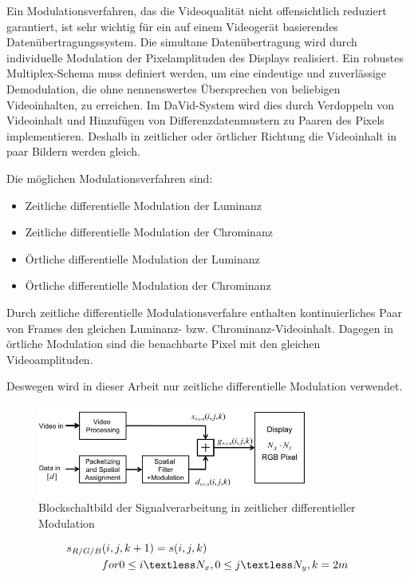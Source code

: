 Ein Modulationsverfahren, das die Videoqualität nicht offensichtlich reduziert garantiert, ist sehr wichtig für ein auf einem Videogerät basierendes Datenübertragungssystem. Die simultane Datenübertragung wird durch individuelle Modulation der Pixelamplituden des Displays realisiert. Ein robustes Multiplex-Schema muss definiert werden, um eine eindeutige und zuverlässige Demodulation, die ohne nennenswertes Übersprechen von beliebigen Videoinhalten, zu erreichen. Im DaVid-System wird dies durch Verdoppeln von Videoinhalt und Hinzufügen von Differenzdatenmustern zu Paaren des Pixels implementieren. Deshalb in zeitlicher oder örtlicher Richtung die Videoinhalt in paar Bildern werden gleich.


Die möglichen Modulationsverfahren sind:
\begin{itemize}
  \item Zeitliche differentielle Modulation der Luminanz
  \item Zeitliche differentielle Modulation der Chrominanz
  \item Örtliche differentielle Modulation der Luminanz
  \item Örtliche differentielle Modulation der Chrominanz
\end{itemize}

Durch zeitliche differentielle Modulationsverfahre enthalten kontinuierliches Paar von Frames den gleichen Luminanz- bzw. Chrominanz-Videoinhalt. Dagegen in örtliche Modulation sind die benachbarte Pixel mit den gleichen Videoamplituden.


Deswegen wird in dieser Arbeit nur zeitliche differentielle Modulation verwendet.

\begin{figure}[htb]
 \centering 
 \includegraphics[keepaspectratio,width=0.8\textwidth]{images/David2.jpg}
 \caption{Blockschaltbild der Signalverarbeitung in zeitlicher differentieller Modulation}
 \label{fig:David1}
\end{figure}




\begin{equation}
\begin{split}
s_{R/G/B}&(i,j,k+1) = s(i,j,k)\\
&for  0\le i \textless N_x, 0\le j \textless N_y,k=2m
\end{split}
\end{equation}

